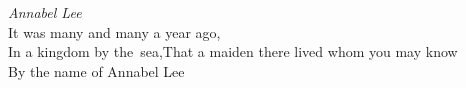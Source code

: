 \documentclass{article}
\begin{document}
\noindent\emph{Annabel Lee}\\[3mm]
It was many and many a year ago,\\[3mm]
In a kingdom by the~sea,\linebreak[4]
That a maiden there lived whom you may know\\
By the name of Annabel Lee
\end{document}
